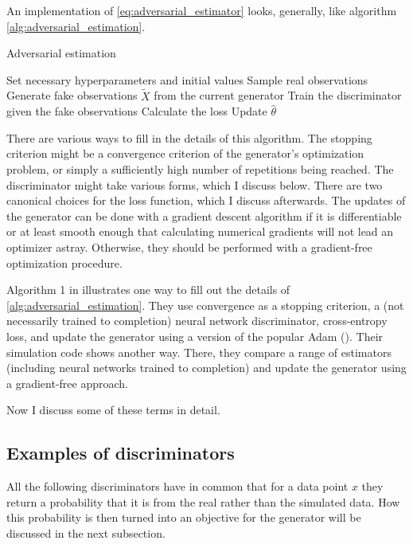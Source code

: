 An implementation of \ref{eq:adversarial_estimator} looks, generally, like algorithm \ref{alg:adversarial_estimation}.

\begin{algorithm}
    \caption{Adversarial estimation}
    \label{alg:adversarial_estimation}
    \begin{algorithmic}
        \STATE Set necessary hyperparameters and initial values
        \STATE Sample real observations
            \STATE Generate fake observations $\widetilde{X}$ from the current generator
            \STATE Train the discriminator given the fake observations
            \STATE Calculate the loss
            \STATE Update $\hat{\theta}$ %
        \ENDWHILE
    \end{algorithmic}
\end{algorithm}

There are various ways to fill in the details of this algorithm.
The stopping criterion might be a convergence criterion of the generator's optimization problem, or simply a sufficiently high number of repetitions being reached.
The discriminator might take various forms, which I discuss below.
There are two canonical choices for the loss function, which I discuss afterwards.
The updates of the generator can be done with a gradient descent algorithm if it is differentiable or at least smooth enough that calculating numerical gradients will not lead an optimizer astray.
Otherwise, they should be performed with a gradient-free optimization procedure.

Algorithm 1 in \textcite{kaji2023adversarial} illustrates one way to fill out the details of \ref{alg:adversarial_estimation}.
They use convergence as a stopping criterion, a (not necessarily trained to completion) neural network discriminator, cross-entropy loss, and update the generator using a version of the popular Adam (\cite{diederik2014adam}).
Their simulation code shows another way. %
There, they compare a range of estimators (including neural networks trained to completion) and update the generator using a gradient-free approach.

Now I discuss some of these terms in detail.

\subsection{Examples of discriminators}
\label{sec:discriminators}
All the following discriminators have in common that for a data point $x$ they return a probability that it is from the real rather than the simulated data.
How this probability is then turned into an objective for the generator will be discussed in the next subsection.

